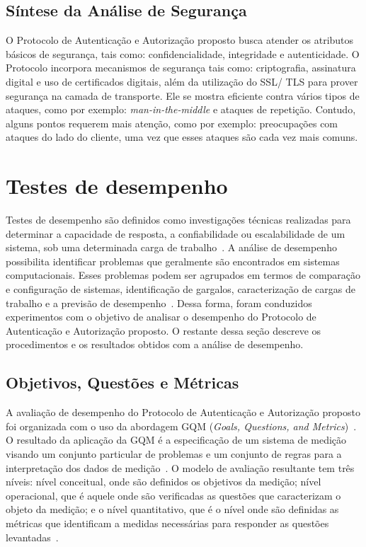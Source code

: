 \subsection{S\'{i}ntese da An\'{a}lise de Seguran\c ca}

O Protocolo de Autenticação e Autorização proposto busca atender os atributos básicos de segurança, tais como: confidencialidade, integridade e autenticidade. O Protocolo incorpora mecanismos de segurança tais como: criptografia, assinatura digital e uso de certificados digitais, além da utilização do SSL/ TLS para prover segurança na camada de transporte. Ele se mostra eficiente contra vários tipos de ataques, como por exemplo: \emph{man-in-the-middle} e ataques de repetição. Contudo, alguns pontos requerem mais atenção, como por exemplo: preocupações com ataques do lado do cliente, uma vez que esses ataques são cada vez mais comuns.

\section{Testes de desempenho}

Testes de desempenho são definidos como investiga\c c\~{o}es técnicas realizadas para determinar a capacidade de resposta, a confiabilidade ou escalabilidade de um sistema, sob uma determinada carga de trabalho~\cite{Meier2007}.
A análise de desempenho possibilita identificar problemas que geralmente são encontrados em sistemas computacionais.
Esses problemas podem ser agrupados em termos de comparação e configuração de sistemas, identificação de gargalos, caracterização de cargas de trabalho e a previsão de desempenho~\cite{jain1991art}. Dessa forma, foram conduzidos experimentos com o objetivo de analisar o desempenho do Protocolo de Autenticação e Autorização proposto. O restante dessa se\c c\~{a}o descreve os procedimentos e os resultados obtidos com a an\'{a}lise de desempenho.

\subsection{Objetivos, Questões e Métricas}\label{sec:gqm}

A avaliação de desempenho do Protocolo de Autenticação e Autorização proposto foi organizada com o uso da abordagem
GQM (\emph{Goals, Questions, and Metrics})~\cite{gqm}. O resultado da aplicação da GQM é a especificação de um sistema de
medição visando um conjunto particular de problemas e um conjunto de regras para a interpretação dos dados de medição~\cite{gqm}.
O modelo de avaliação resultante tem três níveis: nível conceitual, onde  são definidos os objetivos da medição; nível operacional, que é aquele onde são verificadas as questões  que caracterizam o objeto da medição; e o nível quantitativo, que é o nível onde são definidas as métricas que identificam a medidas necessárias para responder as questões levantadas~\cite{gqm}.

